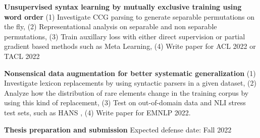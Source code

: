\documentclass[12pt]{article}
\newcommand{\tabitem}{~~\llap{\textbullet}~~}
\begin{document}
\noindent \textbf{Unsupervised syntax learning by mutually exclusive training using word order} (1) Investigate CCG parsing to generate separable permutations on the fly, (2) Representational analysis on separable and non separable permutations, (3) Train auxillary loss with either direct supervision or partial gradient based methods such as Meta Learning, (4) Write paper for ACL 2022 or TACL 2022

\halfblankline

\noindent \textbf{Nonsensical data augmentation for better systematic generalization} (1) Investigate lexicon replacements by using syntactic parsers in a given dataset, (2) Analyze how the distribution of rare elements change in the training corpus by using this kind of replacement, (3) Test on out-of-domain data and NLI stress test sets, such as HANS \cite{mccoy2019}, (4) Write paper for EMNLP 2022.

\halfblankline

\noindent \textbf{Thesis preparation and submission} Expected defense date: Fall 2022




\end{document}
